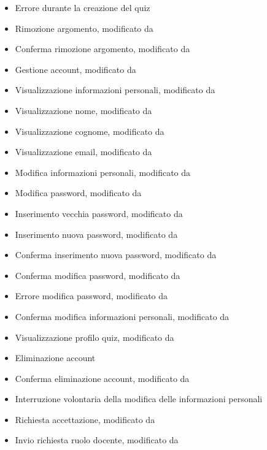 \begin{itemize}
	\item {} Errore durante la creazione del quiz
	\item {} Rimozione argomento, modificato da 
	\item {} Conferma rimozione argomento, modificato da 
	\item {} Gestione account, modificato da 
	\item {} Visualizzazione informazioni personali, modificato da 
	\item {} Visualizzazione nome, modificato da 
	\item {} Visualizzazione cognome, modificato da 
	\item {} Visualizzazione email, modificato da 
	\item {} Modifica informazioni personali, modificato da 
	\item {} Modifica password, modificato da 
	\item {} Inserimento vecchia password, modificato da 
	\item {} Inserimento nuova password, modificato da 
	\item {} Conferma inserimento nuova password, modificato da 
	\item {} Conferma modifica password, modificato da 
	\item {} Errore modifica password, modificato da 
	\item {} Conferma modifica informazioni personali, modificato da 
	\item {} Visualizzazione profilo quiz, modificato da 
	\item {} Eliminazione account 
	\item {} Conferma eliminazione account, modificato da 
	\item {} Interruzione volontaria della modifica delle informazioni personali
	\item {} Richiesta accettazione, modificato da 
	\item {} Invio richiesta ruolo docente, modificato da 

\end{itemize}
